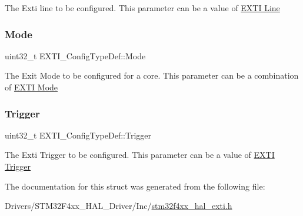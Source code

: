 The Exti line to be configured. This parameter can be a value of \hyperlink{group___e_x_t_i___line}{E\+X\+TI Line} \mbox{\label{struct_e_x_t_i___config_type_def_a6393a89a8cd198b19e10876e6f12cf5b}} 
\subsubsection{\texorpdfstring{Mode}{Mode}}
{\footnotesize\ttfamily uint32\+\_\+t E\+X\+T\+I\+\_\+\+Config\+Type\+Def\+::\+Mode}

The Exit Mode to be configured for a core. This parameter can be a combination of \hyperlink{group___e_x_t_i___mode}{E\+X\+TI Mode} \mbox{\label{struct_e_x_t_i___config_type_def_acf6d2ea84df5f2b705676584ae00707a}} 
\subsubsection{\texorpdfstring{Trigger}{Trigger}}
{\footnotesize\ttfamily uint32\+\_\+t E\+X\+T\+I\+\_\+\+Config\+Type\+Def\+::\+Trigger}

The Exti Trigger to be configured. This parameter can be a value of \hyperlink{group___e_x_t_i___trigger}{E\+X\+TI Trigger} 

The documentation for this struct was generated from the following file\+:\begin{DoxyCompactItemize}
\item 
Drivers/\+S\+T\+M32\+F4xx\+\_\+\+H\+A\+L\+\_\+\+Driver/\+Inc/\hyperlink{stm32f4xx__hal__exti_8h}{stm32f4xx\+\_\+hal\+\_\+exti.\+h}\end{DoxyCompactItemize}
